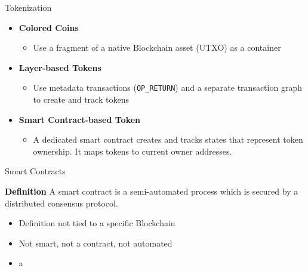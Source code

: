 \documentclass[handout]{beamer}
\begin{document}
\begin{frame}{Tokenization}	
	\begin{itemize}
		\item<1 ->\textbf{Colored Coins}
		\begin{itemize}
			\item<1 ->Use a fragment of a native Blockchain asset (UTXO) as a container
		\end{itemize}
		\vspace{1em}
		\item<2 ->\textbf{Layer-based Tokens}
		\begin{itemize}
			\item<2 -> Use metadata transactions (\texttt{OP\_RETURN}) and a separate transaction graph to create and track tokens
		\end{itemize}
		\vspace{1em}
		\item<3 ->\textbf{Smart Contract-based Token}
		\begin{itemize}
			\item<3 -> A dedicated smart contract creates and tracks states that represent token ownership. It maps tokens to current owner addresses.
		\end{itemize}
	\end{itemize}
\end{frame}


\begin{frame}{Smart Contracts}
	\begin{block}{\textbf{\textcolor{black}{Definition}}}
		A smart contract is a semi-automated process which is secured by a distributed consensus protocol.
	\end{block}
	\begin{itemize}
		\item<2-> Definition not tied to a specific Blockchain
		\item<3-> Not smart, not a contract, not automated
		\item<4-> a
	\end{itemize}
\end{frame}

\end{document}
